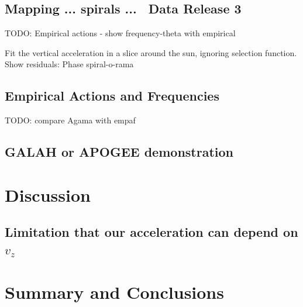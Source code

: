 \subsection{Mapping ... spirals ... \gaia\ Data Release 3}
\label{sec:gaiadr3}

TODO: Empirical actions - show frequency-theta with empirical

Fit the vertical acceleration in a slice around the sun, ignoring selection function.
Show residuals: Phase spiral-o-rama


\subsection{Empirical Actions and Frequencies}
\label{sec:gaiadr3}

TODO: compare Agama with empaf


\subsection{GALAH or APOGEE demonstration}
\label{sec:gaiadr3}


\section{Discussion} \label{sec:discussion}

\subsection{Limitation that our acceleration can depend on $v_z$}


\section{Summary and Conclusions} \label{sec:conclusions}


